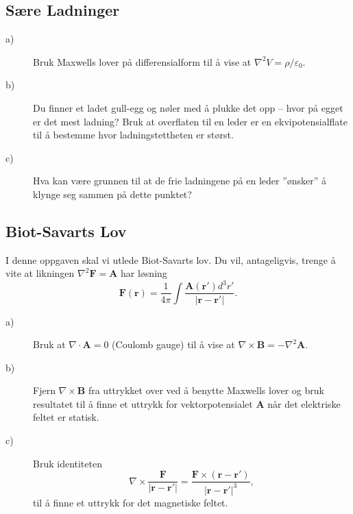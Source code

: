 \documentclass[twoside,utf8]{article}
\begin{document}
\subsection{Sære Ladninger}
\begin{description}
  \item[a)] Bruk Maxwells lover på differensialform til å vise at $\nabla^2 V = \rho/\varepsilon_0$.
  \item[b)] Du finner et ladet gull-egg og nøler med å plukke det opp -- hvor på egget er det mest ladning? Bruk at overflaten til en leder er en ekvipotensialflate til å bestemme hvor ladningstettheten er størst.
  \item[c)] Hva kan være grunnen til at de frie ladningene på en leder ''ønsker'' å klynge seg sammen på dette punktet?
\end{description}



\subsection{Biot-Savarts Lov}
  I denne oppgaven skal vi utlede Biot-Savarts lov. Du vil, antageligvis, trenge å vite at likningen $\nabla^2 \mathbf{F} = \mathbf{A}$ har løsning
  \[
    \mathbf{F}(\mathbf{r}) = \frac{1}{4\pi}\int \frac{\mathbf{A}(\mathbf{r}')d^3r'}{|\mathbf{r}-\mathbf{r}'|}.
  \]
\begin{description}
  \item[a)] Bruk at $\nabla \cdot \mathbf{A}=0$ (Coulomb gauge) til å vise at $\nabla \times \mathbf{B} = - \nabla^2 \mathbf{A}$.
  \item[b)] Fjern $\nabla \times \mathbf{B}$ fra uttrykket over ved å benytte Maxwells lover og bruk resultatet til å finne et uttrykk for vektorpotensialet $\mathbf{A}$ når det elektriske feltet er statisk.
  \item[c)] Bruk identiteten
  \[
    \nabla \times \frac{\mathbf{F}}{|\mathbf{r}-\mathbf{r}'|}
    = \frac{ \mathbf{F}\times (\mathbf{r}-\mathbf{r}')}{|\mathbf{r}-\mathbf{r}'|^3},
  \]
  til å finne et uttrykk for det magnetiske feltet.
\end{description}
\end{document}
